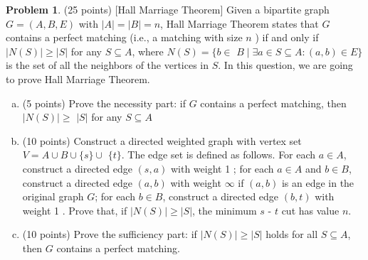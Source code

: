 \documentclass{article}
\theoremstyle{definition}
\newtheorem{prob}{Problem}
\begin{document}
	\begin{prob}
		(25 points) [Hall Marriage Theorem] Given a bipartite graph $G=(A, B, E)$ with $|A|=|B|=n$, Hall Marriage Theorem states that $G$ contains a perfect matching (i.e., a matching with size $n$ ) if and only if $|N(S)| \geq|S|$ for any $S \subseteq A$, where $N(S)=\{b \in$ $B \mid \exists a \in S \subseteq A:(a, b) \in E\}$ is the set of all the neighbors of the vertices in $S$. In this question, we are going to prove Hall Marriage Theorem.
		
		\begin{enumerate}[(a)]
			\item (5 points) Prove the necessity part: if $G$ contains a perfect matching, then $|N(S)| \geq$ $|S|$ for any $S \subseteq A$
			\item (10 points) Construct a directed weighted graph with vertex set $V=A \cup B \cup\{s\} \cup$ $\{t\}$. The edge set is defined as follows. For each $a \in A$, construct a directed edge $(s, a)$ with weight 1 ; for each $a \in A$ and $b \in B$, construct a directed edge $(a, b)$ with weight $\infty$ if $(a, b)$ is an edge in the original graph $G$; for each $b \in B$, construct a directed edge $(b, t)$ with weight 1 . Prove that, if $|N(S)| \geq|S|$, the minimum $s$ - $t$ cut has value $n$.
			\item (10 points) Prove the sufficiency part: if $|N(S)| \geq|S|$ holds for all $S \subseteq A$, then $G$ contains a perfect matching.
		\end{enumerate}
	\end{prob}
		
\end{document}
